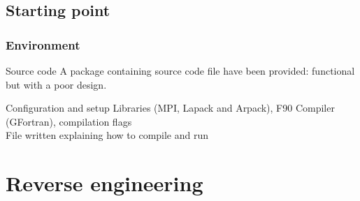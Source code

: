 \documentclass[10p]{beamer}
\begin{document}
\subsection{Starting point}

\begin{frame}
\frametitle{Environment}
\begin{block}{Source code}
A package containing source code file have been provided: functional but with a poor design.
\end{block}
\begin{block}{Configuration and setup}
Libraries (MPI, Lapack and Arpack), F90 Compiler (GFortran), compilation flags
\\File written explaining how to compile and run
\end{block}
\end{frame}
\section{Reverse engineering}
\end{document}
